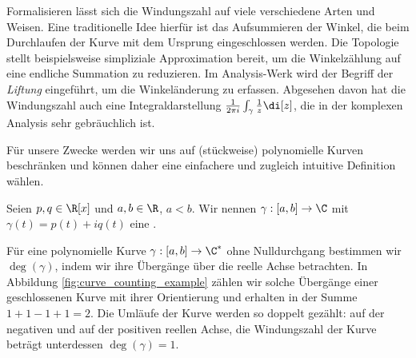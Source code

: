 \documentclass{mythesis}
\begin{document}
Formalisieren lässt sich die Windungszahl auf viele verschiedene Arten und Weisen.
Eine traditionelle Idee hierfür ist das Aufsummieren der Winkel, die beim Durchlaufen der Kurve mit dem Ursprung eingeschlossen werden.
Die Topologie stellt beispielsweise simpliziale Approximation bereit, um die Winkelzählung auf eine endliche Summation zu reduzieren.
Im Analysis-Werk \cite[§12.7]{koenigsberger2003analysis} wird der Begriff der \emph{Liftung} eingeführt, um die Winkeländerung zu erfassen.
Abgesehen davon hat die Windungszahl auch eine Integraldarstellung $\frac{1}{2\pi i} \int_{\gamma} \frac{1}{z} \di[z]$, die in der komplexen Analysis sehr gebräuchlich ist.

Für unsere Zwecke werden wir uns auf (stückweise) polynomielle Kurven beschränken und können daher eine einfachere und zugleich intuitive Definition wählen.

\begin{definition}
    Seien $p, q \in \R[x]$ und $a, b \in \R$, $a < b$.
    Wir nennen $\gamma: [a, b] \to \C$ mit $\gamma(t) = p(t) + iq(t)$ eine .
\end{definition}

Für eine polynomielle Kurve $\gamma: [a,b] \to \C^*$ ohne Nulldurchgang bestimmen wir $\deg(\gamma)$, indem wir ihre Übergänge über die reelle Achse betrachten.
In Abbildung \ref{fig:curve_counting_example} zählen wir solche Übergänge einer geschlossenen Kurve mit ihrer Orientierung und erhalten in der Summe $1 + 1 - 1 + 1 = 2$.
Die Umläufe der Kurve werden so doppelt gezählt: auf der negativen und auf der positiven reellen Achse, die Windungszahl der Kurve beträgt unterdessen $\deg(\gamma) = 1$.
\end{document}

